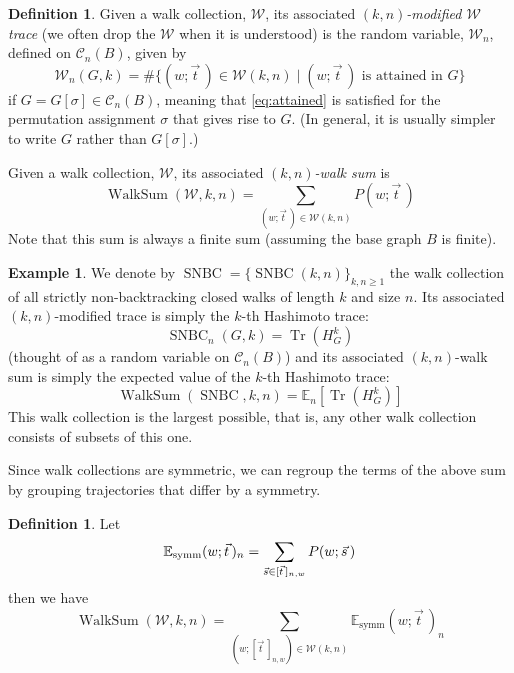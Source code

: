 \documentclass{memo-l}
\theoremstyle{plain}
\theoremstyle{definition}
\numberwithin{section}{chapter}
\numberwithin{equation}{chapter}
\DeclareMathOperator{\WalkSum}{WalkSum}
\DeclareMathOperator{\Tr}{Tr}
\DeclareMathOperator{\SNBC}{SNBC}
\newcommand{\from}{\colon}
\newcommand{\potwalk}{(w;\vec t\,)}
\newcommand{\Edir}{E^{\mathrm{dir}}}
\theoremstyle{plain}
\theoremstyle{definition}
\newtheorem{defn}[theorem]{Definition}
\newtheorem{ex}[theorem]{Example}
\newcommand\EE{\mathbb{E}}
\newcommand\cC{\mathcal{C}}
\newcommand\cS{\mathcal{S}}
\begin{document}
\begin{defn}
Given a walk collection, \( \mathcal{W} \), its associated
\( (k,n) \)\emph{-modified $\mathcal{W}$ trace} (we often drop the
$\mathcal{W}$ when it is understood)
is the random variable, \( \mathcal{W}_n
\), defined on \( \cC_n(B) \), 
given by
\[ \mathcal{W}_n(G,k) = \# \{ \potwalk
\in \mathcal{W}(k,n) \mid \potwalk 
\text{ is attained in } G \} \] if \(G=G[\sigma]
\in \cC_n(B) \),
meaning that \eqref{eq:attained} is satisfied for the permutation
assignment $\sigma$ that gives rise to $G$.
(In general, it is usually simpler to write $G$ rather than
$G[\sigma]$.)


Given a walk collection, \( \mathcal{W} \), its associated
\((k,n) \)\emph{-walk sum} is \[ \WalkSum(\mathcal{W},k,n) = \sum_{\potwalk
\in \mathcal{W}(k,n)} \!\!\!\!\!\!P\potwalk \] Note that this sum is always
a finite sum (assuming the base graph \( B \) is finite).
\end{defn}

\begin{ex}
\label{ex:SNBC}
 We denote by \( \SNBC=\{ \SNBC(k,n)\}_{k,n
\geq 1} \) the walk collection of all strictly non-backtracking closed
walks of length \(k\) and size \(n\). Its associated \( (k,n) \)-modified
trace is simply the $k$-th Hashimoto trace: \[ \SNBC_n(G,k) =
\Tr(H_G^k) \] (thought of as a random variable on \( \cC_n(B) \)) and its
associated \( (k,n) \)-walk sum is simply the expected value of the
$k$-th Hashimoto trace: \[ \WalkSum(\SNBC,k,n) = \EE_n[ \Tr(H^k_G)
] \] This walk collection is the largest possible, that is, any other walk
collection consists of subsets of this one.  \end{ex}


Since walk collections are symmetric, we can regroup the terms of the above
sum by grouping trajectories that differ by a symmetry.  
\begin{defn} \label{de:symmetrized_sum}
Let
\[ \EE_{\rm{symm}}\potwalk_n = \sum_{\vec s \in [\vec t \, ]_{n,w}}
P(w;\vec s\,) \] then we have
\begin{equation}\label{eq:WalkSum_by_walk_classes}
\WalkSum(\mathcal{W},k,n) = \!\!\!\!\! \sum_{(w;[\vec t\,]_{n,w}) \in
\mathcal{W}(k,n)} \!\!\!\!\! \EE_\text{symm}\potwalk_n \end{equation}
\end{defn}
\end{document}
